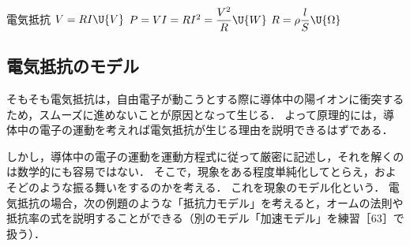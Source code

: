 \bsNeed{26mm}
\begin{matome}{電気抵抗}
 \hspace{3mm} $V=RI\U{V}$ \hspace{10mm} $P=VI=RI^2=\dfrac{V^2}{R}\U{W}$ \hspace{10mm} $R=\rho\dfrac{l}{S}\U{\Omega}$
\end{matome}

\subsection{電気抵抗のモデル}

そもそも電気抵抗は，自由電子が動こうとする際に導体中の陽イオンに衝突するため，スムーズに進めないことが原因となって生じる．
よって原理的には，導体中の電子の運動を考えれば電気抵抗が生じる理由を説明できるはずである．

しかし，導体中の電子の運動を運動方程式に従って厳密に記述し，それを解くのは数学的にも容易ではない．
そこで，現象をある程度単純化してとらえ，およそどのような振る舞いをするのかを考える．
これを現象の{\gtfamily モデル化}という．
電気抵抗の場合，次の例題のような「抵抗力モデル」を考えると，オームの法則や抵抗率の式を説明することができる（別のモデル「加速モデル」を練習［63］で扱う）．

